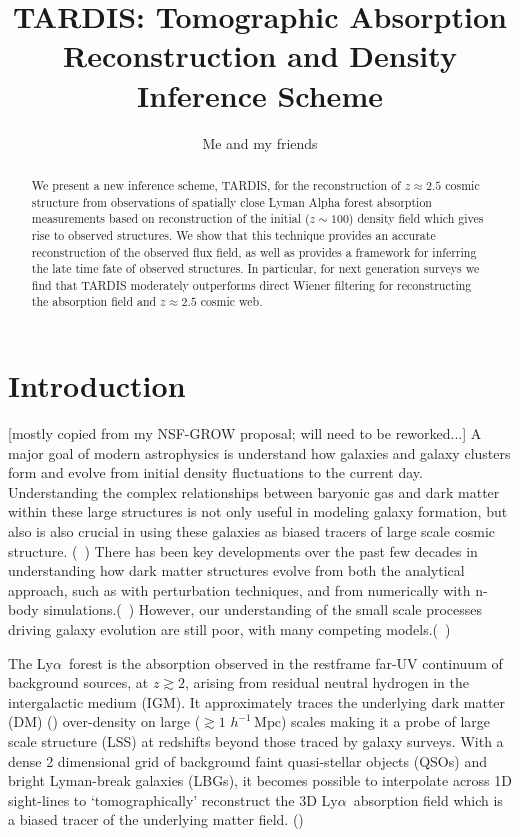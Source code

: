 \documentclass[usenatbib,onecolumn]{mnras}
\title{TARDIS: Tomographic Absorption Reconstruction and Density Inference Scheme}
\author{Me and my friends}
\newcommand{\mpc}{\ensuremath{\, h^{-1}\,\mathrm{Mpc} }}
\newcommand{\lya}{Ly$\alpha$}
\begin{document}
\maketitle

\begin{abstract}
We present a new inference scheme, TARDIS, for the reconstruction of $z \approx 2.5$ cosmic structure from observations of spatially close Lyman Alpha forest absorption measurements based on reconstruction of the initial ($z \sim 100$) density field which gives rise to observed structures. We show that this technique provides an accurate reconstruction of the observed flux field, as well as provides a framework for inferring the late time fate of observed structures. In particular, for next generation surveys we find that TARDIS moderately outperforms direct Wiener filtering for reconstructing the absorption field and $z\approx 2.5$ cosmic web.
\end{abstract}
\tableofcontents
\section{Introduction}

[mostly copied from my NSF-GROW proposal; will need to be reworked...]
A major goal of modern astrophysics is understand how galaxies and galaxy clusters form and evolve from initial density fluctuations to the current day. Understanding the complex relationships between baryonic gas and dark matter within these large structures is not only useful in modeling galaxy formation, but also is also crucial in using these galaxies as biased tracers of large scale cosmic structure. (~\cite{galaxybias}) There has been key developments over the past few decades in understanding how dark matter structures evolve from both the analytical approach, such as with perturbation techniques, and from numerically with n-body simulations.(~\cite{reviewGal2}) However, our understanding of the small scale processes driving galaxy evolution are still poor, with many competing models.(~\cite{reviewGal})

The \lya\ forest is the absorption observed in the restframe far-UV continuum of background 
sources, at $z \gtrsim 2$, 
arising from residual neutral hydrogen in the intergalactic
medium (IGM). It approximately traces the underlying dark matter (DM) (\cite{BiGe})
over-density on large ($\gtrsim 1\,\mpc$) scales making it a probe of large scale structure (LSS) at redshifts beyond those traced by galaxy surveys. With a dense 2 dimensional grid of background faint quasi-stellar objects (QSOs) and bright Lyman-break galaxies (LBGs), it becomes possible to
interpolate across 1D sight-lines to `tomographically'
reconstruct the 3D \lya\ absorption field which is a biased tracer of the underlying matter field. (\cite{caucci}) 
\end{document}

